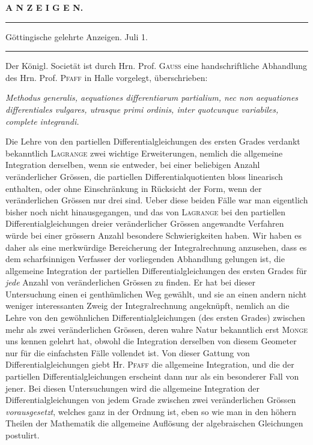 \clearpage{}
\begin{center}\textbf{A N Z E I G E N.}\par\bigskip
\rule{.85\linewidth}{.4pt}\par
Göttingische gelehrte Anzeigen. Juli 1.\par
\rule{.85\linewidth}{.4pt}\end{center}
Der Königl. Societät ist durch Hrn. Prof. \textsc{Gauss} eine handschriftliche Abhandlung des Hrn. Prof. \textsc{Pfaff} in Halle vorgelegt, überschrieben:
\begin{center}\textit{Methodus generalis, aequationes differentiarum partialium, nec non aequationes differentiales vulgares, utrasque primi ordinis, inter quotcunque variabiles, complete integrandi.}\end{center}
Die Lehre von den partiellen Differentialgleichungen des ersten Grades verdankt bekanntlich \textsc{Lagrange} zwei wichtige Erweiterungen, nemlich die allgemeine Integration derselben, wenn sie entweder, bei einer beliebigen Anzahl veränderlicher Grössen, die partiellen Differentialquotienten bloss linearisch enthalten, oder ohne Einschränkung in Rücksicht der Form, wenn der veränderlichen Grössen nur drei sind. Ueber diese beiden Fälle war man eigentlich bisher noch nicht hinausgegangen, und das von \textsc{Lagrange} bei den partiellen Differentialgleichungen dreier veränderlicher Grössen angewandte Verfahren würde bei einer grössern Anzahl besondere Schwierigkeiten haben. Wir haben es daher als eine merkwürdige Bereicherung der Integralrechnung anzusehen, dass es dem scharfsinnigen Verfasser der vorliegenden Abhandlung gelungen ist, die allgemeine Integration der partiellen Differentialgleichungen des ersten Grades für \textit{jede} Anzahl von veränderlichen Grössen zu finden. Er hat bei dieser Untersuchung einen ei%
genthümlichen Weg gewählt, und sie an einen andern nicht weniger interessanten Zweig der Integralrechnung angeknüpft, nemlich an die Lehre von den gewöhnlichen Differentialgleichungen (des ersten Grades) zwischen mehr als zwei veränderlichen Grössen, deren wahre Natur bekanntlich erst \textsc{Monge} uns kennen gelehrt hat, obwohl die Integration derselben von diesem Geometer nur für die einfachsten Fälle vollendet ist. Von dieser Gattung von Differentialgleichungen giebt Hr. \textsc{Pfaff} die allgemeine Integration, und die der partiellen Differentialgleichungen erscheint dann nur als ein besonderer Fall von jener. Bei diesen Untersuchungen wird die allgemeine Integration der Differentialgleichungen von jedem Grade zwischen zwei veränderlichen Grössen \textit{vorausgesetzt}, welches ganz in der Ordnung ist, eben so wie man in den höhern Theilen der Mathematik die allgemeine Auflösung der algebraischen Gleichungen postulirt.

